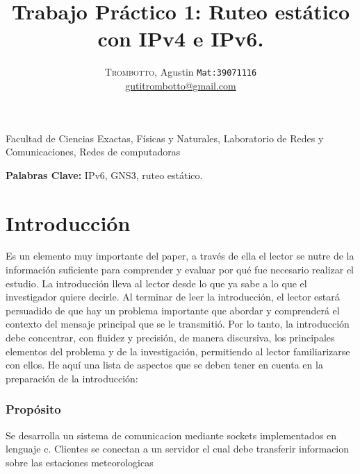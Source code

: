 \documentclass[10pt, a4paper,notitlepage]{article}
\newcommand{\HRule}{\rule{\linewidth}{0.5mm}} %
\begin{document}
{\center \large \textsf{Facultad de Ciencias Exactas, Físicas y Naturales, Laboratorio de Redes y
Comunicaciones, Redes de computadoras\\}}
\title{%
		{ \bfseries{Trabajo Práctico 1: Ruteo estático con IPv4 e IPv6.}}\\[0.4cm]
		} %
\author{
\textsc{Trombotto}, Agustin  {\small \texttt{Mat:39071116}}\\
\href{mailto:gutitrombotto@gmail.com}{gutitrombotto@gmail.com}\\
}

{\let\newpage\relax\maketitle}



\textbf{Palabras Clave:} IPv6, GNS3, ruteo estático.\\

\section{Introducción}
Es un elemento muy importante del paper, a través de ella el lector se nutre de la información 
suficiente para  comprender y evaluar por qué fue necesario realizar el estudio.
La introducción lleva al lector desde lo que ya sabe a lo que el investigador quiere decirle. Al
terminar de leer la introducción, el lector estará persuadido de que hay un problema
importante que abordar y comprenderá el contexto del mensaje principal que se le transmitió.
Por lo tanto, la introducción debe concentrar, con fluidez y precisión, de manera discursiva, los
principales elementos del problema y de la investigación, permitiendo al lector familiarizarse
con ellos.
He aquí una lista de aspectos que se deben tener en cuenta en la preparación de la introducción:
\subsubsection{Propósito}
Se desarrolla un sistema de comunicacion mediante sockets implementados en lenguaje c. Clientes se conectan a un servidor el cual debe transferir informacion sobre las estaciones meteorologicas
\end{document}
